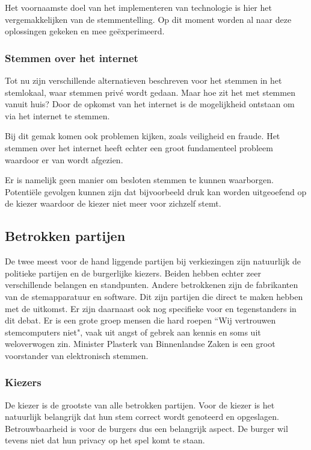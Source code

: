 \documentclass[a4paper]{article}
\newcommand{\TODO}[1]{{\color{red}\textbf{TODO: #1}}}
\renewcommand{\TODO}[1]{}
\begin{document}
Het voornaamste doel van het implementeren van technologie is hier het vergemakkelijken van de stemmentelling.
Op dit moment worden al naar deze oplossingen gekeken en mee ge{\"e}xperimeerd.

\subsubsection{Stemmen over het internet}
Tot nu zijn verschillende alternatieven beschreven voor het stemmen in het stemlokaal, waar stemmen priv{\'e} wordt gedaan. 
Maar hoe zit het met stemmen vanuit huis?
Door de opkomst van het internet is de mogelijkheid ontstaan om via het internet te stemmen.

Bij dit gemak komen ook problemen kijken, zoals veiligheid en fraude. 
Het stemmen over het internet heeft echter een groot fundamenteel probleem waardoor er van wordt afgezien.

Er is namelijk geen manier om besloten stemmen te kunnen waarborgen.
Potenti{\"e}le gevolgen kunnen zijn dat bijvoorbeeld druk kan worden uitgeoefend op de kiezer waardoor de kiezer niet meer voor zichzelf stemt.

\subsection{Betrokken partijen}
De twee meest voor de hand liggende partijen bij verkiezingen zijn natuurlijk de politieke partijen en de burgerlijke kiezers. 
Beiden hebben echter zeer verschillende belangen en standpunten. 
Andere betrokkenen zijn de fabrikanten van de stemapparatuur en software.
Dit zijn partijen die direct te maken hebben met de uitkomst.
Er zijn daarnaast ook nog specifieke voor en tegenstanders in dit debat.
Er is een grote groep mensen die hard roepen ``Wij vertrouwen stemcomputers niet", vaak uit angst of gebrek aan kennis en soms uit weloverwogen zin.
Minister Plasterk van Binnenlandse Zaken is een groot voorstander van elektronisch stemmen.

\subsubsection{Kiezers}
De kiezer is de grootste van alle betrokken partijen.
Voor de kiezer is het natuurlijk belangrijk dat hun stem correct wordt genoteerd en opgeslagen. 
Betrouwbaarheid is voor de burgers dus een belangrijk aspect.
De burger wil tevens niet dat hun privacy op het spel komt te staan.
\TODO{Referentie naar iets waaruit blijkt dat een burger het wettelijke recht heeft om zijn of haar stemkeuze geheim te houden?}
\end{document}
